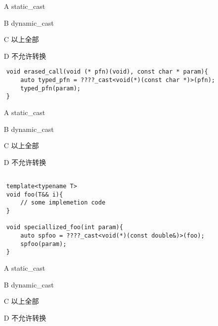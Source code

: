 \documentclass[12pt,fancyhdr]{ctexart}
\begin{document}
\begin{itemize}
    \item [A]
        static\_cast
    \item [B]
        dynamic\_cast
    \item [C]
        以上全部
    \item [D]
        不允许转换
\end{itemize}

\begin{verbatim}
    void erased_call(void (* pfn)(void), const char * param){
        auto typed_pfn = ????_cast<void(*)(const char *)>(pfn);
        typed_pfn(param);
    }
\end{verbatim}

\begin{itemize}
    \item [A]
        static\_cast
    \item [B]
        dynamic\_cast
    \item [C]
        以上全部
    \item [D]
        不允许转换
\end{itemize}

\begin{verbatim}

    template<typename T>
    void foo(T&& i){
        // some implemetion code
    }
    
    void speciallized_foo(int param){
        auto spfoo = ????_cast<void(*)(const double&)>(foo);
        spfoo(param);
    }
\end{verbatim}

\begin{itemize}
    \item [A]
        static\_cast
    \item [B]
        dynamic\_cast
    \item [C]
        以上全部
    \item [D]
        不允许转换
\end{itemize}
\end{document}
